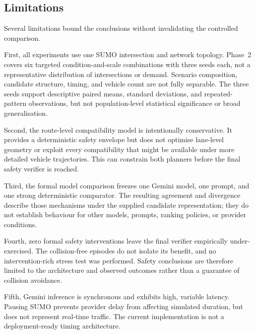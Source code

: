 \documentclass[letterpaper,10pt,conference]{ieeeconf}
\begin{document}
\subsection{Limitations}



Several limitations bound the conclusions without invalidating the controlled comparison.



First, all experiments use one SUMO intersection and network topology. Phase~2 covers six targeted condition-and-scale combinations with three seeds each, not a representative distribution of intersections or demand. Scenario composition, candidate structure, timing, and vehicle count are not fully separable. The three seeds support descriptive paired means, standard deviations, and repeated-pattern observations, but not population-level statistical significance or broad generalisation.



Second, the route-level compatibility model is intentionally conservative. It provides a deterministic safety envelope but does not optimise lane-level geometry or exploit every compatibility that might be available under more detailed vehicle trajectories. This can constrain both planners before the final safety verifier is reached.



Third, the formal model comparison freezes one Gemini model, one prompt, and one strong deterministic comparator. The resulting agreement and divergence describe those mechanisms under the supplied candidate representation; they do not establish behaviour for other models, prompts, ranking policies, or provider conditions.



Fourth, zero formal safety interventions leave the final verifier empirically under-exercised. The collision-free episodes do not isolate its benefit, and no intervention-rich stress test was performed. Safety conclusions are therefore limited to the architecture and observed outcomes rather than a guarantee of collision avoidance.



Fifth, Gemini inference is synchronous and exhibits high, variable latency. Pausing SUMO prevents provider delay from affecting simulated duration, but does not represent real-time traffic. The current implementation is not a deployment-ready timing architecture.
\end{document}
